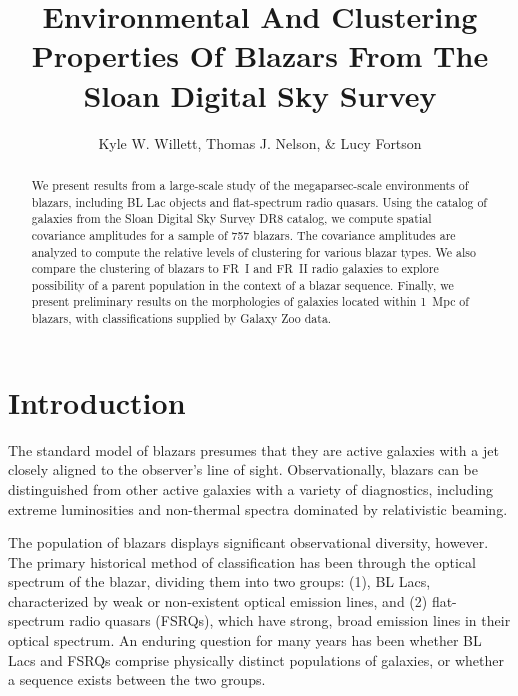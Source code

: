 \documentclass{emulateapj}
\begin{document}
\title{Environmental And Clustering Properties Of Blazars From The Sloan Digital Sky Survey}

\author{Kyle W. Willett, Thomas J. Nelson, \& Lucy Fortson}


\begin{abstract}
We present results from a large-scale study of the megaparsec-scale environments of blazars, including BL Lac objects and flat-spectrum radio quasars. Using the catalog of galaxies from the Sloan Digital Sky Survey DR8 catalog, we compute spatial covariance amplitudes for a sample of 757 blazars. The covariance amplitudes are analyzed to compute the relative levels of clustering for various blazar types. We also compare the clustering of blazars to FR~I and FR~II radio galaxies to explore possibility of a parent population in the context of a blazar sequence. Finally, we present preliminary results on the morphologies of galaxies located within 1~Mpc of blazars, with classifications supplied by Galaxy Zoo data.
\end{abstract}


\section{Introduction} \label{sec-intro}


The standard model of blazars presumes that they are active galaxies with a jet closely aligned to the observer's line of sight. Observationally, blazars can be distinguished from other active galaxies with a variety of diagnostics, including extreme luminosities and non-thermal spectra dominated by relativistic beaming. 

The population of blazars displays significant observational diversity, however. The primary historical method of classification has been through the optical spectrum of the blazar, dividing them into two groups: (1), BL Lacs, characterized by weak or non-existent optical emission lines, and (2) flat-spectrum radio quasars (FSRQs), which have strong, broad emission lines in their optical spectrum. An enduring question for many years has been whether BL Lacs and FSRQs comprise physically distinct populations of galaxies, or whether a sequence exists between the two groups. 
\end{document}
